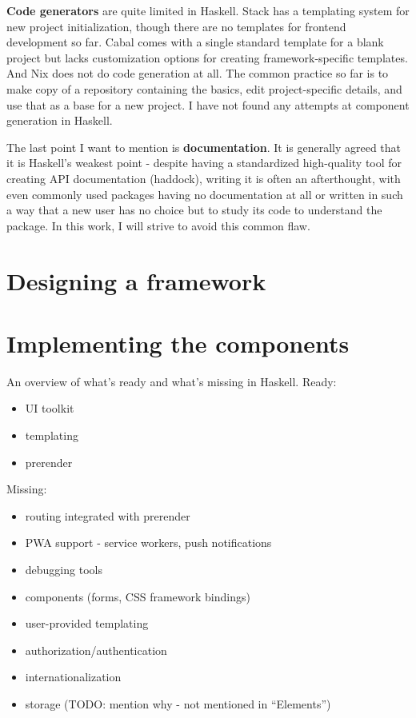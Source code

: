 \documentclass[english,odsaz]{fitthesis}
\begin{document}
\textbf{Code generators} are quite limited in Haskell. Stack has a templating system for
new project initialization, though there are no templates for frontend
development so far. Cabal comes with a single standard template for a blank
project but lacks customization options for creating framework-specific
templates. And Nix does not do code generation at all. The common practice so
far is to make copy of a repository containing the basics, edit project-specific
details, and use that as a base for a new project. I have not found any attempts
at component generation in Haskell.

The last point I want to mention is \textbf{documentation}. It is generally agreed that
it is Haskell's weakest point - despite having a standardized
high-quality tool for creating API documentation (haddock), writing it is often an
afterthought, with even commonly used packages having no documentation at all or
written in such a way that a new user has no choice but to study its code to
understand the package. In this work, I will strive to avoid this common flaw.

\chapter{Designing a framework}
\label{sec:orga2aa9da}
\chapter{Implementing the components}
\label{sec:org1701515}
An overview of what's ready and what's missing in Haskell. Ready:
\begin{itemize}
\item UI toolkit
\item templating
\item prerender
\end{itemize}

Missing:
\begin{itemize}
\item routing integrated with prerender
\item PWA support - service workers, push notifications
\item debugging tools
\item components (forms, CSS framework bindings)
\item user-provided templating
\item authorization/authentication
\item internationalization
\item storage (TODO: mention why - not mentioned in ``Elements'')
\end{itemize}
\end{document}

